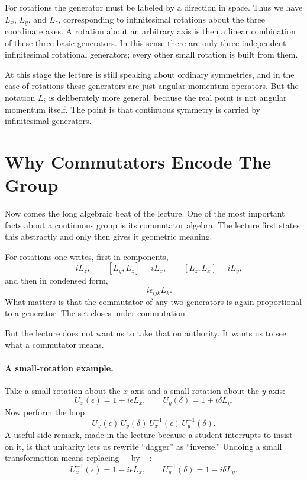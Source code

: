 For rotations the generator must be labeled by a direction in space. Thus we have \(L_x\), \(L_y\), and \(L_z\), corresponding to infinitesimal rotations about the three coordinate axes. A rotation about an arbitrary axis is then a linear combination of these three basic generators. In this sense there are only three independent infinitesimal rotational generators; every other small rotation is built from them.

At this stage the lecture is still speaking about ordinary symmetries, and in the case of rotations these generators are just angular momentum operators. But the notation \(L_i\) is deliberately more general, because the real point is not angular momentum itself. The point is that continuous symmetry is carried by infinitesimal generators.

\section{Why Commutators Encode The Group}

Now comes the long algebraic beat of the lecture. One of the most important facts about a continuous group is its commutator algebra. The lecture first states this abstractly and only then gives it geometric meaning.

For rotations one writes, first in components,
\begin{equation}
[L_x,L_y]=iL_z,
\qquad
[L_y,L_z]=iL_x,
\qquad
[L_z,L_x]=iL_y,
\end{equation}
and then in condensed form,
\begin{equation}
[L_i,L_j]=i\epsilon_{ijk}L_k.
\end{equation}
What matters is that the commutator of any two generators is again proportional to a generator. The set closes under commutation.

But the lecture does not want us to take that on authority. It wants us to see what a commutator means.

\paragraph{A small-rotation example.}

Take a small rotation about the \(x\)-axis and a small rotation about the \(y\)-axis:
\begin{equation}
U_x(\epsilon)=1+i\epsilon L_x,
\qquad
U_y(\delta)=1+i\delta L_y.
\end{equation}
Now perform the loop
\begin{equation}
U_x(\epsilon)\,U_y(\delta)\,U_x^{-1}(\epsilon)\,U_y^{-1}(\delta).
\end{equation}
A useful side remark, made in the lecture because a student interrupts to insist on it, is that unitarity lets us rewrite ``dagger'' as ``inverse.'' Undoing a small transformation means replacing \(+\) by \(-\):
\begin{equation}
U_x^{-1}(\epsilon)=1-i\epsilon L_x,
\qquad
U_y^{-1}(\delta)=1-i\delta L_y.
\end{equation}

